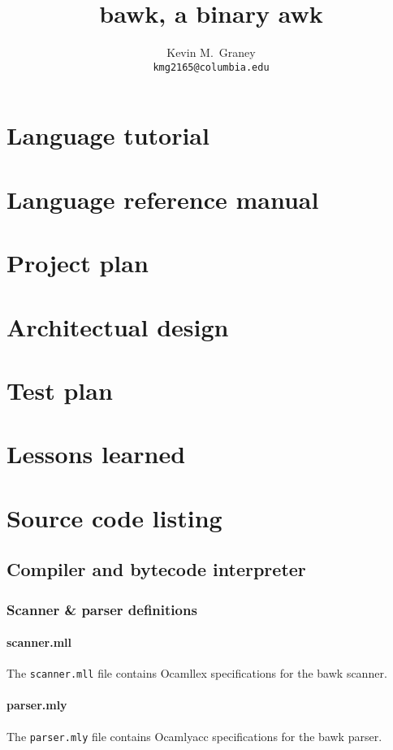 \documentclass[letterpaper,11pt]{report}
\title{bawk, a binary awk}
\author{
	Kevin M.\ Graney\\
	\texttt{kmg2165@columbia.edu}
}
\begin{document}
\maketitle
\tableofcontents
\lstlistoflistings

\chapter{Language tutorial}
\chapter{Language reference manual}
\chapter{Project plan}
\chapter{Architectual design}
\chapter{Test plan}
\chapter{Lessons learned}


\chapter{Source code listing}
\lstset{language=Caml,defaultdialect=[Objective]Caml}

\section{Compiler and bytecode interpreter}
\subsection{Scanner \& parser definitions}
\subsubsection{scanner.mll}
The \texttt{scanner.mll} file contains Ocamllex specifications for the bawk scanner.

\subsubsection{parser.mly}
The \texttt{parser.mly} file contains Ocamlyacc specifications for the bawk parser.

\end{document}
